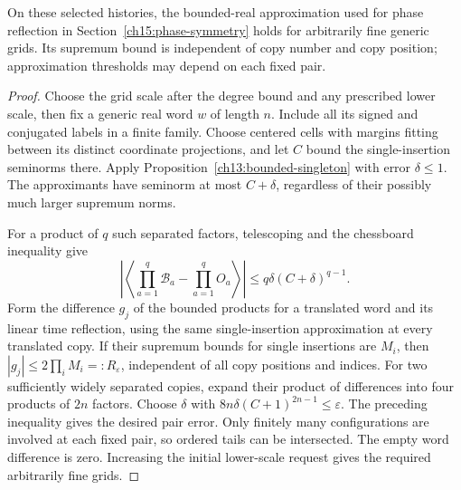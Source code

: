 \begin{corollary}
\label{ch13:bounded-word}
On these selected histories, the bounded-real approximation used for phase
reflection in Section~\ref{ch15:phase-symmetry} holds for arbitrarily fine
generic grids. Its supremum bound is independent of copy number and copy
position; approximation thresholds may depend on each fixed pair.
\end{corollary}
\begin{proof}
Choose the grid scale after the degree bound and any prescribed lower
scale, then fix a generic real word $w$ of length $n$. Include all its
signed and conjugated labels in a finite family. Choose centered cells
with margins fitting between its distinct coordinate projections, and
let $C$ bound the single-insertion seminorms there. Apply
Proposition~\ref{ch13:bounded-singleton} with error $\delta\le1$.
The approximants have seminorm at most $C+\delta$, regardless of their
possibly much larger supremum norms.

For a product of $q$ such separated factors, telescoping and the
chessboard inequality give
\[
 \left|\left\langle\prod_{a=1}^q\mathcal B_a-\prod_{a=1}^qO_a
               \right\rangle\right|
                  \le q\delta(C+\delta)^{q-1}.
\]
Form the difference $g_j$ of the bounded products for a translated word
and its linear time reflection, using the same single-insertion approximation
at every translated copy. If their supremum bounds for single insertions are $M_i$,
then $|g_j|\le2\prod_iM_i=:R_\varepsilon$, independent of all copy
positions and indices. For two sufficiently widely separated copies,
expand their product of differences into four products of $2n$ factors.
Choose $\delta$ with $8n\delta(C+1)^{2n-1}\le\varepsilon$.
The preceding inequality gives the desired pair error. Only finitely
many configurations are involved at each fixed pair, so ordered tails
can be intersected. The empty word difference is zero. Increasing the
initial lower-scale request gives the required arbitrarily fine grids.
\end{proof}
